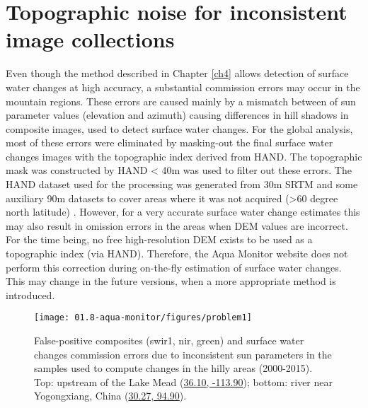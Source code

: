 

\section{Topographic noise for inconsistent image collections}
Even though the method described in Chapter \ref{ch4} allows detection of surface water changes at high accuracy, a substantial commission errors may occur in the mountain regions. These errors are caused mainly by a mismatch between of sun parameter values (elevation and azimuth) causing differences in hill shadows in composite images, used to detect surface water changes. For the global analysis, most of these errors were eliminated by masking-out the final surface water changes images with the topographic index derived from HAND. The topographic mask was constructed by  HAND < 40m was used to filter out these errors. The HAND dataset used for the processing was generated from 30m SRTM and some auxiliary 90m datasets to cover areas where it was not acquired (>60 degree north latitude) \citep{donchyts2016hand}. However, for a very accurate surface water change estimates this may also result in omission errors in the areas when DEM values are incorrect. For the time being, no free high-resolution DEM exists to be used as a topographic index (via HAND). Therefore, the Aqua Monitor website does not perform this correction during on-the-fly estimation of surface water changes. This may change in the future versions, when a more appropriate method is introduced.

\begin{figure}
	\centering
	\texttt{[image: 01.8-aqua-monitor/figures/problem1]}
	\caption{False-positive composites (swir1, nir, green) and surface water changes commission errors due to inconsistent sun parameters in the samples used to compute changes in the hilly areas (2000-2015). Top: upstream of the Lake Mead (\href{http://aqua-monitor.appspot.com/?from=2000&to=2013&view=36.103119715292486,-113.93795967102045,13z&max_doy=365}{36.10, -113.90}); bottom: river near Yogongxiang, China (\href{http://aqua-monitor.appspot.com/?mode=dynamic&from=2000&to=2013&view=30.269128374988604,94.89677429199217,12z&max_doy=365&averaging_months1=36&averaging_months2=36}{30.27, 94.90}).}
	\label{fig:am-topographic-errors}
\end{figure}

